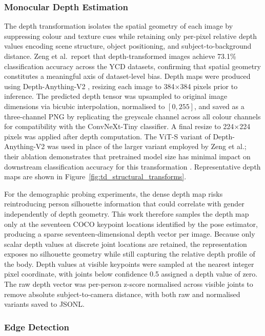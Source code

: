 \subsubsection{Monocular Depth Estimation}
\label{subsec:depth}

The depth transformation isolates the spatial geometry of each image by suppressing colour and texture cues while retaining only per-pixel relative depth values encoding scene structure, object positioning, and subject-to-background distance. Zeng et al.\ report that depth-transformed images achieve 73.1\% classification accuracy across the YCD datasets, confirming that spatial geometry constitutes a meaningful axis of dataset-level bias. Depth maps were produced using Depth-Anything-V2 \cite{Yang_2024_DepthAnythingV2}, resizing each image to 384$\times$384 pixels prior to inference. The predicted depth tensor was upsampled to original image dimensions via bicubic interpolation, normalised to $[0, 255]$, and saved as a three-channel PNG by replicating the greyscale channel across all colour channels for compatibility with the ConvNeXt-Tiny classifier. A final resize to 224$\times$224 pixels was applied after depth computation. The ViT-S variant of Depth-Anything-V2 was used in place of the larger variant employed by Zeng et al.; their ablation demonstrates that pretrained model size has minimal impact on downstream classification accuracy for this transformation \cite[Table~3]{Zeng_2024_UnderstandingBiasinLargeScaleVisualDatasets}. Representative depth maps are shown in Figure~\ref{fig:td_structural_transforms}.

For the demographic probing experiments, the dense depth map risks reintroducing person silhouette information that could correlate with gender independently of depth geometry. This work therefore samples the depth map only at the seventeen COCO keypoint locations identified by the pose estimator, producing a sparse seventeen-dimensional depth vector per image. Because only scalar depth values at discrete joint locations are retained, the representation exposes no silhouette geometry while still capturing the relative depth profile of the body. Depth values at visible keypoints were sampled at the nearest integer pixel coordinate, with joints below confidence 0.5 assigned a depth value of zero. The raw depth vector was per-person z-score normalised across visible joints to remove absolute subject-to-camera distance, with both raw and normalised variants saved to JSONL.

\subsubsection{Edge Detection}
\label{subsec:edge_detection}

